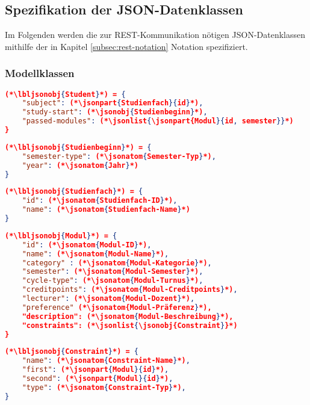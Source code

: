 \FloatBarrier
\subsection{Spezifikation der JSON-Datenklassen}

Im Folgenden werden die zur REST-Kommunikation nötigen JSON-Datenklassen mithilfe der in Kapitel \ref{subsec:rest-notation} Notation spezifiziert. 

\subsubsection*{Modellklassen}

\begin{lstlisting}[language=json]
(*\lbljsonobj{Student}*) = {
	"subject": (*\jsonpart{Studienfach}{id}*),
	"study-start": (*\jsonobj{Studienbeginn}*),
	"passed-modules": (*\jsonlist{\jsonpart{Modul}{id, semester}}*)
}
\end{lstlisting}

\begin{lstlisting}[language=json]
(*\lbljsonobj{Studienbeginn}*) = {
	"semester-type": (*\jsonatom{Semester-Typ}*),
	"year": (*\jsonatom{Jahr}*)
}
\end{lstlisting}

\begin{lstlisting}[language=json]	
(*\lbljsonobj{Studienfach}*) = {
	"id": (*\jsonatom{Studienfach-ID}*),
	"name": (*\jsonatom{Studienfach-Name}*)
}
\end{lstlisting}


\begin{lstlisting}[language=json]
(*\lbljsonobj{Modul}*) = {
	"id": (*\jsonatom{Modul-ID}*),
	"name": (*\jsonatom{Modul-Name}*),
	"category" : (*\jsonatom{Modul-Kategorie}*),
	"semester": (*\jsonatom{Modul-Semester}*),
	"cycle-type": (*\jsonatom{Modul-Turnus}*),
	"creditpoints": (*\jsonatom{Modul-Creditpoints}*),
	"lecturer": (*\jsonatom{Modul-Dozent}*),
	"preference" (*\jsonatom{Modul-Präferenz}*),
	"description": (*\jsonatom{Modul-Beschreibung}*),	
	"constraints": (*\jsonlist{\jsonobj{Constraint}}*)
}
\end{lstlisting}

\begin{lstlisting}[language=json]
(*\lbljsonobj{Constraint}*) = {
	"name": (*\jsonatom{Constraint-Name}*),
	"first": (*\jsonpart{Modul}{id}*),
	"second": (*\jsonpart{Modul}{id}*),
	"type": (*\jsonatom{Constraint-Typ}*),
}
\end{lstlisting}

